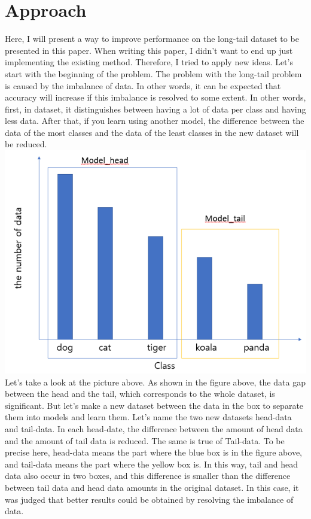 \documentclass[extendedabs]{bmvc2k}
\begin{document}
\section{Approach}
  \quad Here, I will present a way to improve performance on the long-tail dataset to be presented in this paper. When writing this paper, 
  I didn't want to end up just implementing the existing method. Therefore, I tried to apply new ideas. Let's start with the beginning of the problem.
  The problem with the long-tail problem is caused by the imbalance of data. In other words, it can be expected that accuracy will increase if this imbalance is resolved to some extent.
  In other words, first, in dataset, it distinguishes between having a lot of data per class and having less data. After that, if you learn using another model, 
  the difference between the data of the most classes and the data of the least classes in the new dataset will be reduced.
  \newline  \includegraphics[width=\linewidth]{images/03_project.PNG}
  Let's take a look at the picture above. As shown in the figure above, the data gap between the head and the tail, which corresponds to the whole dataset, is significant.
  But let's make a new dataset between the data in the box to separate them into models and learn them. Let's name the two new datasets head-data and tail-data. 
  In each head-date, the difference between the amount of head data and the amount of tail data is reduced. The same is true of Tail-data. To be precise here, 
  head-data means the part where the blue box is in the figure above, and tail-data means the part where the yellow box is. 
  In this way, tail and head data also occur in two boxes, and this difference is smaller than the difference between tail data and head data amounts in the original dataset. 
  In this case, it was judged that better results could be obtained by resolving the imbalance of data.
\end{document}
